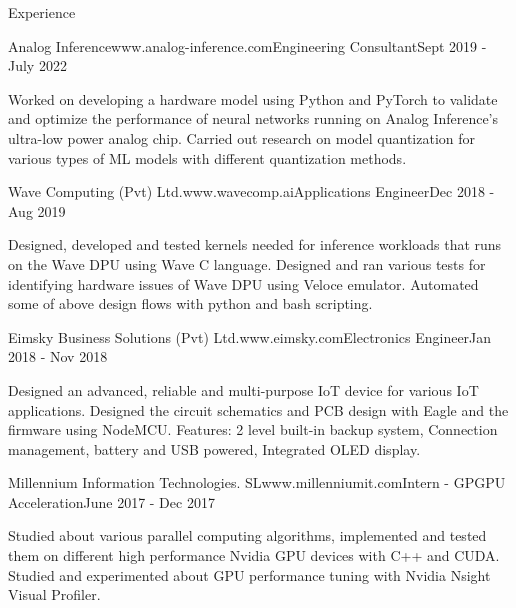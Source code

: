 \documentclass[
	11pt, %
]{./assets/resume} %
\begin{document}
\begin{rSection}{Experience}
	\pagebreak

	\begin{rSubsectionX}{Analog Inference}{www.analog-inference.com}{Engineering Consultant}{Sept 2019 - July 2022}
		\item Worked on developing a hardware model using Python and PyTorch to validate and optimize the performance of neural networks running on Analog Inference’s ultra-low power analog chip. Carried out research on model quantization for various types of ML models with different quantization methods.
	\end{rSubsectionX}
    
	\begin{rSubsectionX}{Wave Computing (Pvt) Ltd.}{www.wavecomp.ai}{Applications Engineer}{Dec 2018 - Aug 2019}
        \item Designed, developed and tested kernels needed for inference workloads that runs on the Wave DPU using Wave C language. Designed and ran various tests for identifying hardware issues of Wave DPU using Veloce emulator. Automated some of above design flows with python and bash scripting.
	\end{rSubsectionX}

	\begin{rSubsectionX}{Eimsky Business Solutions (Pvt) Ltd.}{www.eimsky.com}{Electronics Engineer}{Jan 2018 - Nov 2018}
        \item Designed an advanced, reliable and multi-purpose IoT device for various IoT applications. Designed the circuit schematics and PCB design with Eagle and the firmware using NodeMCU. Features: 2 level built-in backup system, Connection management, battery and USB powered, Integrated OLED display.
	\end{rSubsectionX}

 	\begin{rSubsectionX}{Millennium Information Technologies. SL}{www.millenniumit.com}{Intern - GPGPU Acceleration}{June 2017 - Dec 2017}
        \item Studied about various parallel computing algorithms, implemented and tested them on different high performance Nvidia GPU devices with C++ and CUDA. Studied and experimented about GPU performance tuning with Nvidia Nsight Visual Profiler.
	\end{rSubsectionX}
\end{rSection}

\end{document}
